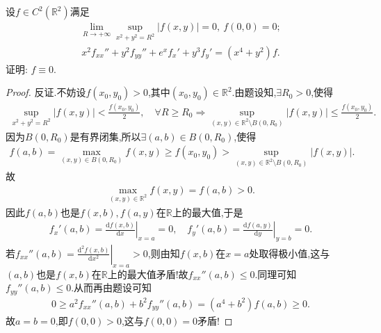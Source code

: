 \documentclass[../../main.tex]{subfiles}%
\begin{document}
\begin{example}
设$f\in C^2(\mathbb{R}^2)$满足
\begin{align*}
\lim\limits_{R\to+\infty}\sup\limits_{x^2+y^2=R^2}|f(x,y)|=0,\ f(0,0)=0;
\end{align*}
\begin{align*}
x^2f_{xx}''+y^2f_{yy}''+e^xf_x'+y^3f_y'=(x^4+y^2)f.
\end{align*}
证明: $f\equiv0$.
\end{example}
\begin{proof}
反证.不妨设$f(x_0,y_0)>0$,其中$(x_0,y_0)\in\mathbb{R}^2$.由题设知,$\exists R_0>0$,使得
\begin{align*}
\sup\limits_{x^2+y^2=R^2}|f(x,y)|<\frac{f(x_0,y_0)}{2},\quad\forall R\geqslant R_0\Longrightarrow \sup\limits_{(x,y)\in\mathbb{R}^2\setminus B(0,R_0)}|f(x,y)|\leqslant\frac{f(x_0,y_0)}{2}.
\end{align*}
因为$B(0,R_0)$是有界闭集,所以$\exists (a,b)\in B(0,R_0)$,使得
\begin{align*}
f(a,b)=\max\limits_{(x,y)\in B(0,R_0)}f(x,y)\geqslant f(x_0,y_0)>\sup\limits_{(x,y)\in\mathbb{R}^2\setminus B(0,R_0)}|f(x,y)|.
\end{align*}
故
\begin{align*}
\max\limits_{(x,y)\in\mathbb{R}^2}f(x,y)=f(a,b)>0.
\end{align*}
因此$f(a,b)$也是$f(x,b),f(a,y)$在$\mathbb{R}$上的最大值,于是
\begin{align*}
f_x'(a,b)=\left.\frac{\mathrm{d}f(x,b)}{\mathrm{d}x}\right|_{x=a}=0,\quad f_y'(a,b)=\left.\frac{\mathrm{d}f(a,y)}{\mathrm{d}y}\right|_{y=b}=0.
\end{align*}
若$f_{xx}''(a,b)=\left.\frac{\mathrm{d}^2f(x,b)}{\mathrm{d}x^2}\right|_{x=a}>0$,则由知$f(x,b)$在$x=a$处取得极小值,这与$(a,b)$也是$f(x,b)$在$\mathbb{R}$上的最大值矛盾!故$f_{xx}''(a,b)\leqslant 0$.同理可知$f_{yy}''(a,b)\leqslant 0$.从而再由题设可知
\begin{align*}
0\geqslant a^2f_{xx}''(a,b)+b^2f_{yy}''(a,b)=(a^4+b^2)f(a,b)\geqslant 0.
\end{align*}
故$a=b=0$,即$f(0,0)>0$,这与$f(0,0)=0$矛盾!
\end{proof}
\end{document}
